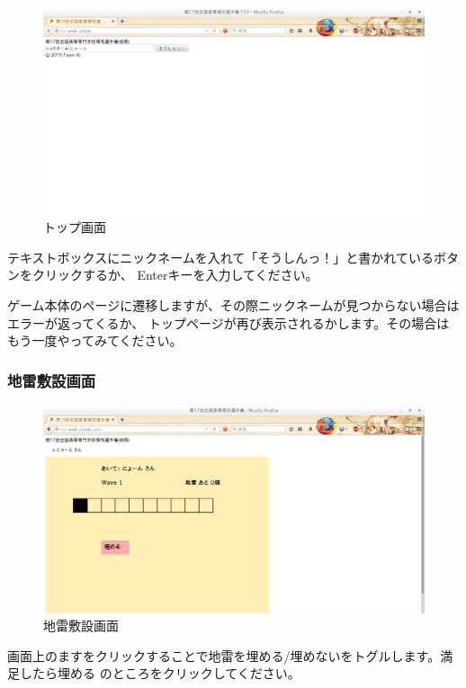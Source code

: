 \begin{figure}[htbp]
\centering
\includegraphics{./top.png}
\caption{トップ画面}
\end{figure}

テキストボックスにニックネームを入れて「そうしんっ！」と書かれているボタンをクリックするか、
Enterキーを入力してください。

ゲーム本体のページに遷移しますが、その際ニックネームが見つからない場合はエラーが返ってくるか、
トップページが再び表示されるかします。その場合はもう一度やってみてください。

\subsubsection{地雷敷設画面}\label{ux5730ux96f7ux6577ux8a2dux753bux9762}

\begin{figure}[htbp]
\centering
\includegraphics{./mine.png}
\caption{地雷敷設画面}
\end{figure}

画面上のますをクリックすることで地雷を埋める/埋めないをトグルします。満足したら埋める
のところをクリックしてください。

